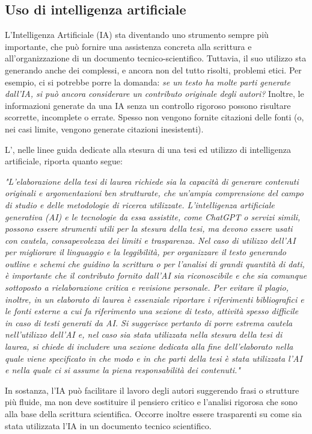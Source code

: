 \documentclass[9pt,a4paper,twoside]{rho-class/rho}
\begin{document}
\subsection{Uso di intelligenza artificiale}
L'Intelligenza Artificiale (IA) sta diventando uno strumento sempre più importante, che può fornire una assistenza concreta alla scrittura e all'organizzazione di un documento tecnico-scientifico. Tuttavia, il suo utilizzo sta generando anche dei complessi, e ancora non del tutto risolti, problemi etici. Per esempio, ci si potrebbe porre la domanda: \textit{se un testo ha molte parti generate dall'IA, si può ancora considerare un contributo originale degli autori?} Inoltre, le informazioni generate da una IA senza un controllo rigoroso possono risultare scorrette, incomplete o errate. Spesso non vengono fornite citazioni delle fonti (o, nei casi limite, vengono generate citazioni inesistenti).

L'\textcite{IA}, nelle linee guida dedicate alla stesura di una tesi ed utilizzo di intelligenza artificiale, riporta quanto segue:

\textit{"L'elaborazione della tesi di laurea richiede sia la capacità di generare contenuti originali e argomentazioni ben strutturate, che un'ampia comprensione del campo di studio e delle metodologie di ricerca utilizzate. L’intelligenza artificiale generativa (AI) e le tecnologie da essa assistite, come ChatGPT o servizi simili, possono essere strumenti utili per la stesura della tesi, ma devono essere usati con cautela, consapevolezza dei limiti e trasparenza. Nel caso di utilizzo dell’AI per migliorare il linguaggio e la leggibilità, per organizzare il testo generando outline e schemi che guidino la scrittura o per l'analisi di grandi quantità di dati, è importante che il contributo fornito dall’AI sia riconoscibile e che sia comunque sottoposto a rielaborazione critica e revisione personale. Per evitare il plagio, inoltre, in un elaborato di laurea è essenziale riportare i riferimenti bibliografici e le fonti esterne a cui fa riferimento una sezione di testo, attività spesso difficile in caso di testi generati da AI. Si suggerisce pertanto di porre estrema cautela nell’utilizzo dell’AI e, nel caso sia stata utilizzata nella stesura della tesi di laurea, si chiede di includere una sezione dedicata alla fine dell’elaborato nella quale viene specificato in che modo e in che parti della tesi è stata utilizzata l’AI e nella quale ci si assume la piena responsabilità dei contenuti."}

In sostanza, l’IA può facilitare il lavoro degli autori suggerendo frasi o strutture più fluide, ma non deve sostituire il pensiero critico e l’analisi rigorosa che sono alla base della scrittura scientifica. Occorre inoltre essere trasparenti su come sia stata utilizzata l'IA in un documento tecnico scientifico.
\end{document}

